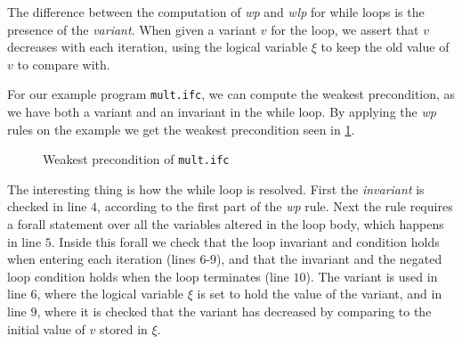 The difference between the computation of \textit{wp} and \textit{wlp} for while loops is the presence of the \textit{variant}. 
When given a variant $v$ for the loop, we assert that $v$ decreases with each iteration, using the logical variable $\xi$ to keep the old value of $v$ to compare with.

For our example program \texttt{mult.ifc}, we can compute the weakest precondition, as we have both a variant and an invariant in the while loop.
By applying the \textit{wp} rules on the example we get the weakest precondition seen in \cref{figure:wpmult}.

\begin{figure}[h!]

\caption{Weakest precondition of \texttt{mult.ifc}}
\label{figure:wpmult}
\end{figure}

The interesting thing is how the while loop is resolved. First the \textit{invariant} is checked in line $4$, according to the first part of the \textit{wp} rule. 
Next the rule requires a forall statement over all the variables altered in the loop body, which happens in line $5$.
Inside this forall we check that the loop invariant and condition holds when entering each iteration (lines $6$-$9$), and that the invariant and the negated loop condition holds when the loop terminates (line $10$).
The variant is used in line $6$, where the logical variable $\xi$ is set to hold the value of the variant, and in line $9$, where it is checked that the variant has decreased by comparing to the initial value of $v$ stored in $\xi$.
